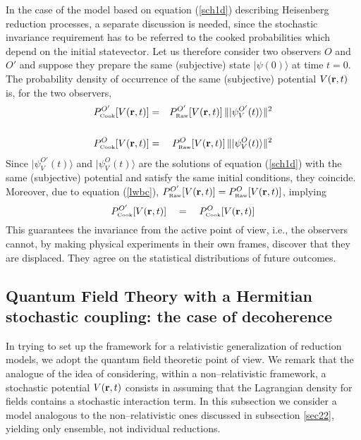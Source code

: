 \documentclass[12pt]{article}
\begin{document}
In the case of the model based on equation (\ref{sch1d})
describing Heisenberg reduction processes, a separate discussion
is needed, since the stochastic invariance requirement has to be
referred to the cooked probabilities which depend on the initial
statevector. Let us therefore consider two observers $O$ and $O'$
and suppose they prepare the same (subjective) state
$|\psi(0)\rangle$ at time $t = 0$. The probability density of
occurrence of the same (subjective) potential $V({\bf r}, t)$ is,
for the two observers,
\begin{eqnarray}
P_{\makebox{\tiny Cook}}^{O'}[V({\bf r}, t)] & = &
P_{\makebox{\tiny Raw}}^{O'}[V({\bf r}, t)]\,
\| |\psi_{V}^{O'}(t)\rangle \|^{2} \nonumber \\
& & \\
P_{\makebox{\tiny Cook}}^{O}[V({\bf r}, t)] & = &
P_{\makebox{\tiny Raw}}^{O}[V({\bf r}, t)]\, \|
|\psi_{V}^{O}(t)\rangle \|^{2} \nonumber
\end{eqnarray}
Since $|\psi_{V}^{O'}(t)\rangle$ and $|\psi_{V}^{O}(t)\rangle$ are
the solutions of equation (\ref{sch1d}) with the same (subjective)
potential and satisfy the same initial conditions, they coincide.
Moreover, due to equation (\ref{lwbc}), $P_{\makebox{\tiny
Raw}}^{O'}[V({\bf r}, t)] = P_{\makebox{\tiny Raw}}^{O}[V({\bf r},
t)]$, implying
\begin{equation}
P_{\makebox{\tiny Cook}}^{O'}[V({\bf r}, t)] \quad = \quad
P_{\makebox{\tiny Cook}}^{O}[V({\bf r}, t)]
\end{equation}
This guarantees the invariance from the active point of view,
i.e., the observers cannot, by making physical experiments in
their own frames, discover that they are displaced. They agree on
the statistical distributions of future outcomes.

\subsection{Quantum Field Theory with a Hermitian stochastic
coupling: the case of decoherence} \label{sec92}

In trying to set up the framework for a relativistic
generalization of reduction models, we adopt the quantum field
theoretic point of view. We remark that the analogue of the idea
of considering, within a non--relativistic framework, a stochastic
potential $V({\bf r}, t)$ consists in assuming that the Lagrangian
density for fields contains a stochastic interaction term. In this
subsection we consider a model analogous to the non--relativistic
ones discussed in subsection \ref{sec22}, yielding only ensemble,
not individual reductions.
\end{document}
